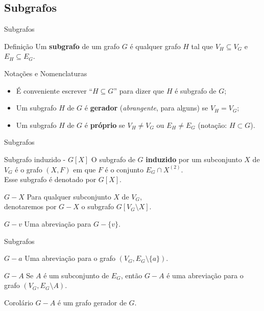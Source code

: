 \documentclass[xcolor=dvipsnames,table]{beamer}
\begin{document}
	\subsection{Subgrafos}
	\begin{frame}{Subgrafos}
		\begin{block}{Definição}
			Um {\bf subgrafo} de um grafo $G$ é qualquer grafo $H$ tal que $V_H \subseteq V_G$ e $E_H \subseteq E_G$.
		\end{block} 
		\begin{block}{Notações e Nomenclaturas}
			\begin{itemize}
				\item É conveniente escrever ``$H \subseteq G$'' para dizer que $H$ é subgrafo de $G$; 
				\item Um subgrafo $H$ de $G$ é {\bf gerador} ({\it abrangente}, para alguns) se $V_H = V_G$; 
				\item Um subgrafo $H$ de $G$ é {\bf próprio} se $V_H \not= V_G$ ou $E_H \not= E_G$ (notação: $H \subset G$).
			\end{itemize}
		\end{block}
	\end{frame}
	
	\begin{frame}{Subgrafos}
		\begin{block}{Subgrafo induzido - $G[X]$}
			O subgrafo de $G$ {\bf induzido} por um subconjunto $X$ de $V_G$ é o grafo $(X, F)$ em que $F$ é o conjunto $E_G \cap X^{(2)}$. \\Esse subgrafo é denotado por $G[X]$.
		\end{block} 
		\begin{block}{$G - X$}
			Para qualquer subconjunto $X$ de $V_G$, \\denotaremos por $G - X$ o subgrafo $G[V_G \setminus X]$.
		\end{block} 
		\begin{block}{$G - v$}
			Uma abreviação para $G - \{ v \}$.
		\end{block}
	\end{frame}
	
	\begin{frame}{Subgrafos}
		\begin{block}{$G - a$}
			Uma abreviação para o grafo $(V_G, E_G \setminus \{ a \})$.
		\end{block} 
		\begin{block}{$G - A$}
			Se $A$ é um subconjunto de $E_G$, então $G - A$ é uma abreviação para o grafo $(V_G, E_G \setminus A)$.
		\end{block} 
		\begin{block}{Corolário}
			$G - A$ é um grafo gerador de $G$.
		\end{block}
	\end{frame}
	
\end{document}
